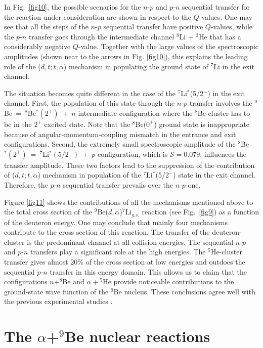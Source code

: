 \documentclass[
11pt, %
english, %
onehalfspacing, %
headsepline, %
]{MastersDoctoralThesis} %
\begin{document}
In Fig.~\ref{fig10}, the possible scenarios for the $n$-$p$ and $p$-$n$ sequential transfer for the reaction under consideration are shown in respect to the $Q$-values. One may see that all the steps of the $n$-$p$ sequential transfer have positive $Q$-values, while the $p$-$n$ transfer goes through the intermediate channel ${}^8$Li + ${}^3$He that has a considerably negative $Q$-value. Together with the large values of the spectroscopic amplitudes (shown near to the arrows in Fig. \ref{fig10}), this explains the leading role of the ($d,t;t,\alpha$) mechanism in populating the ground state of ${}^7$Li in the exit channel.


The situation becomes quite different in the case of the ${}^7$Li$^*$(5/2$^-$) in the exit channel. First, the population of this state through the $n$-$p$ transfer involves the ${}^9$Be~=~${}^8$Be$^*(2^+)$~+~$n$ intermediate configuration where the ${}^8$Be cluster has to be in the $2^+$ excited state. Note that the ${}^8$Be($0^+$) ground state is inappropriate because of angular-momentum-coupling mismatch in the entrance and exit configurations. Second, the extremely small spectroscopic amplitude of the ${}^8$Be$^*(2^+)$~=~${}^7$Li$^*(5/2^-)$~+~$p$ configuration, which is $\mathcal{S} = 0.079$, influences the transfer amplitude. These two factors lead to the suppression of the contribution of ($d,t;t,\alpha$) mechanism in population of the ${}^7$Li$^*$(5/2$^-$) state in the exit channel. Therefore, the $p$-$n$ sequential transfer prevails over the $n$-$p$ one. 

Figure \ref{fig11} shows the contributions of all the mechanisms mentioned above to the total cross section of the ${}^9$Be($d,\alpha$)${}^7$Li$_{g.s.}$ reaction (see Fig.~\ref{fig9}) as a function of the deuteron energy. One may conclude that mainly four mechanisms contribute to the cross section of this reaction. The transfer of the deuteron-cluster is the predominant channel at all collision energies. The sequential $n$-$p$ and $p$-$n$ transfers play a significant role at the high energies. The ${}^5$He-cluster transfer gives almost 20\% of the cross section at low energies and outdoes the sequential $p$-$n$ transfer in this energy domain. This allows us to claim that the configurations $n+^8$Be and $\alpha+{}^5$He provide noticeable contributions to the ground-state wave function of the ${}^9$Be nucleus. These conclusions agree well with the previous experimental studies \cite{brown2007, papka2007}.

\section{The $\alpha$+$^9$Be nuclear reactions}
\end{document}
